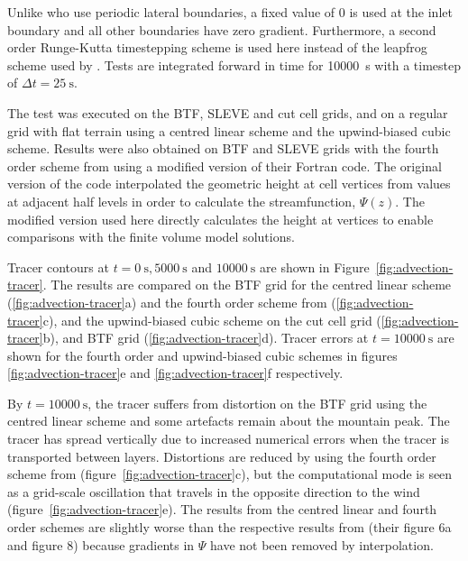 \documentclass[twocol]{ametsoc}
\begin{document}
Unlike \citet{schaer2002} who use periodic lateral boundaries, a fixed value of 0 is used at the inlet boundary and all other boundaries have zero gradient.  Furthermore, a second order Runge-Kutta timestepping scheme is used here instead of the leapfrog scheme used by \citet{schaer2002}.
Tests are integrated forward in time for \SI{10000}{\second} with a timestep of \(\Delta t = \SI{25}{\second}\).

The test was executed on the BTF, SLEVE and cut cell grids, and on a regular grid with flat terrain using a centred linear scheme and the upwind-biased cubic scheme.   Results were also obtained on BTF and SLEVE grids with the fourth order scheme from \citet{schaer2002} using a modified version of their Fortran code.  The original version of the code interpolated the geometric height at cell vertices from values at adjacent half levels in order to calculate the streamfunction, \(\Psi(z)\).  The modified version used here directly calculates the height at vertices to enable comparisons with the finite volume model solutions.

Tracer contours at \(t = \SI{0}{\second}, \SI{5000}{\second}\) and \(\SI{10000}{\second}\) are shown in Figure~\ref{fig:advection-tracer}.
The results are compared on the BTF grid for the centred linear scheme (\ref{fig:advection-tracer}a) and the fourth order scheme from \citet{schaer2002} (\ref{fig:advection-tracer}c), and the upwind-biased cubic scheme on the cut cell grid (\ref{fig:advection-tracer}b), and BTF grid (\ref{fig:advection-tracer}d).  Tracer errors at \(t = \SI{10000}{\second}\) are shown for the fourth order and upwind-biased cubic schemes in figures \ref{fig:advection-tracer}e and \ref{fig:advection-tracer}f respectively.

By \(t = \SI{10000}{\second}\), the tracer suffers from distortion on the BTF grid using the centred linear scheme and some artefacts remain about the mountain peak.  The tracer has spread vertically due to increased numerical errors when the tracer is transported between layers.  Distortions are reduced by using the fourth order scheme from \citet{schaer2002} (figure~\ref{fig:advection-tracer}c), but the computational mode is seen as a grid-scale oscillation that travels in the opposite direction to the wind (figure~\ref{fig:advection-tracer}e).  The results from the centred linear and fourth order schemes are slightly worse than the respective results from \citet{schaer2002} (their figure 6a and figure 8) because gradients in $\Psi$ have not been removed by interpolation.
\end{document}

